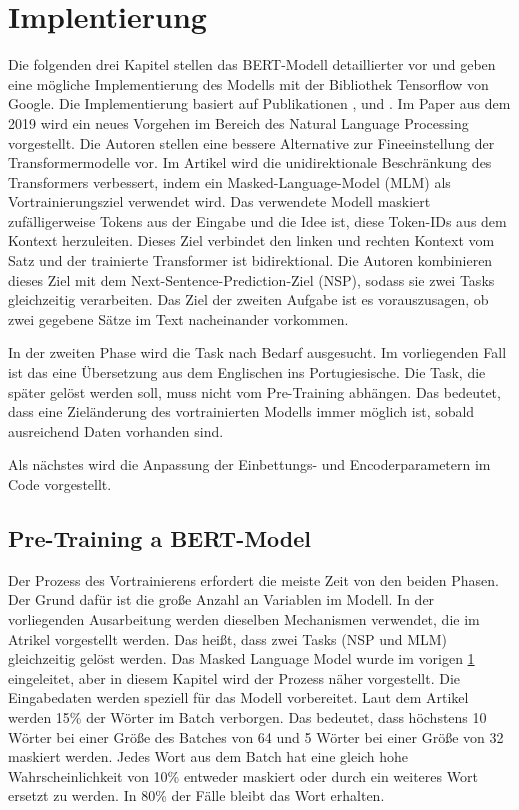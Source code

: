 \section{Implentierung} \label{BERT_Impl}

Die folgenden drei Kapitel stellen das BERT-Modell detaillierter vor und geben eine mögliche Implementierung des Modells mit der Bibliothek Tensorflow von Google. Die Implementierung basiert auf Publikationen \cite{BERT:19}, \cite{BERT_Pre:22} und \cite{BERT_Fine:22}. Im Paper \cite{BERT:19} aus dem 2019 wird ein neues Vorgehen im Bereich des Natural Language Processing vorgestellt. Die Autoren stellen eine bessere Alternative zur Fineeinstellung der Transformermodelle vor. Im Artikel wird die unidirektionale Beschränkung des Transformers verbessert, indem ein Masked-Language-Model (MLM) als Vortrainierungsziel verwendet wird. Das verwendete Modell maskiert zufälligerweise Tokens aus der Eingabe und die Idee ist, diese Token-IDs aus dem Kontext herzuleiten. Dieses Ziel verbindet den linken und rechten Kontext vom Satz und der trainierte Transformer ist bidirektional. Die Autoren kombinieren dieses Ziel mit dem Next-Sentence-Prediction-Ziel (NSP), sodass sie zwei Tasks gleichzeitig verarbeiten. Das Ziel der zweiten Aufgabe ist es vorauszusagen, ob zwei gegebene Sätze im Text nacheinander vorkommen.

In der zweiten Phase wird die Task nach Bedarf ausgesucht. Im vorliegenden Fall ist das eine Übersetzung aus dem Englischen ins Portugiesische. Die Task, die später gelöst werden soll, muss nicht vom Pre-Training abhängen. Das bedeutet, dass eine Zieländerung des vortrainierten Modells immer möglich ist, sobald ausreichend Daten vorhanden sind.

Als nächstes wird die Anpassung der Einbettungs- und Encoderparametern im Code vorgestellt.

\subsection{Pre-Training a BERT-Model}
Der Prozess des Vortrainierens erfordert die meiste Zeit von den beiden Phasen. Der Grund dafür ist die große Anzahl an Variablen im Modell. In der vorliegenden Ausarbeitung werden dieselben Mechanismen verwendet, die im Atrikel \cite{BERT:19} vorgestellt werden. Das heißt, dass zwei Tasks (NSP und MLM) gleichzeitig gelöst werden. Das Masked Language Model wurde im vorigen \cref{BERT_Impl} eingeleitet, aber in diesem Kapitel wird der Prozess näher vorgestellt. Die Eingabedaten werden speziell für das Modell vorbereitet. Laut dem Artikel \cite{BERT:19} werden 15\% der Wörter im Batch verborgen. Das bedeutet, dass höchstens 10 Wörter bei einer Größe des Batches von 64 und 5 Wörter bei einer Größe von 32 maskiert werden. Jedes Wort aus dem Batch hat eine gleich hohe Wahrscheinlichkeit von 10\% entweder maskiert oder durch ein weiteres Wort ersetzt zu werden. In 80\% der Fälle bleibt das Wort erhalten.

